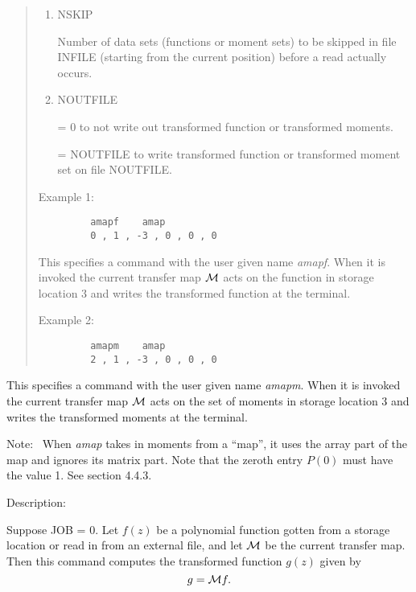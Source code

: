 \begin{quotation}
\begin{enumerate}
      \item  NSKIP

             Number of data sets (functions or moment sets) to be skipped
             in file INFILE (starting from the current position) before a
             read actually occurs.

      \item  NOUTFILE

             = 0 to not write out transformed function or transformed
               moments.

             = NOUTFILE to write transformed function or transformed moment
               set on \hspace*{1em}file NOUTFILE.
\end{enumerate}

\vspace{5mm}
\noindent Example 1:
\begin{verbatim}
         amapf    amap
         0 , 1 , -3 , 0 , 0 , 0
\end{verbatim}
This specifies a command with the user given name {\em amapf}.  When it is invoked the current transfer map ${\cal M}$ acts on the function in storage location 3 and writes the transformed function at the terminal.

\vspace{5mm}
\noindent Example 2:
\begin{verbatim}
         amapm    amap
         2 , 1 , -3 , 0 , 0 , 0
\end{verbatim}
\end{quotation}
This specifies a command with the user given name {\em amapm}.  When it is invoked the current transfer map ${\cal M}$ acts on the set of moments in storage location 3 and writes the transformed moments at the terminal.

Note: \ When {\em amap} takes in moments from a ``map'', it uses the array part of the map and ignores its matrix part.  Note that the zeroth entry $P(0)$ must have the value 1.  See section 4.4.3.

\vspace{5mm}
     Description:
\vspace{2mm}

Suppose JOB = 0.  Let $f(z)$ be a polynomial function gotten from a storage location or read in from an  external file, and let ${\cal M}$ be the current transfer map.  Then this command computes the transformed function $g(z)$ given by
\begin{equation}
g = {\cal M} f.
\end{equation}

